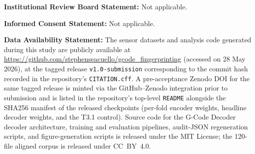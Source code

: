 \documentclass[sensors,article,submit,moreauthors,pdftex]{Definitions/mdpi}
\newcommand{\modelname}{G-Code Decoder}
\providecommand{\institutionalreview}[1]{\medskip\noindent\textbf{Institutional Review Board Statement:} #1\par}
\providecommand{\informedconsent}[1]{\medskip\noindent\textbf{Informed Consent Statement:} #1\par}
\providecommand{\dataavailability}[1]{\medskip\noindent\textbf{Data Availability Statement:} #1\par}
\begin{document}


\institutionalreview{Not applicable.}

\informedconsent{Not applicable.}

\dataavailability{The sensor datasets and analysis code generated during this study are publicly available at \url{https://github.com/stephenseacuello/gcode_fingerprinting} (accessed on 28 May 2026), at the tagged release \texttt{v1.0-submission} corresponding to the commit hash recorded in the repository's \texttt{CITATION.cff}. A pre-acceptance Zenodo DOI for the same tagged release is minted via the GitHub--Zenodo integration prior to submission and is listed in the repository's top-level \texttt{README} alongside the SHA256 manifest of the released checkpoints (per-fold encoder weights, headline decoder weights, and the T3.1 control). Source code for the \modelname{} decoder architecture, training and evaluation pipelines, audit-JSON regeneration scripts, and figure-generation scripts is released under the MIT License; the 120-file aligned corpus is released under CC~BY~4.0.}


\end{document}
